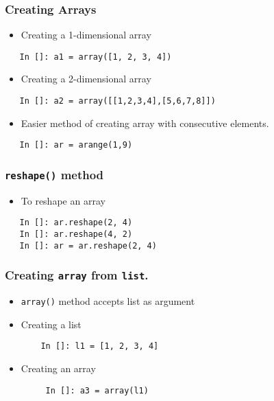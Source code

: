 \documentclass[presentation]{beamer}
\begin{document}
\begin{frame}[fragile]
\frametitle{Creating Arrays}
\label{sec-3}

\begin{itemize}
\item Creating a 1-dimensional array
\end{itemize}

\begin{verbatim}
   In []: a1 = array([1, 2, 3, 4])
\end{verbatim}

\begin{itemize}
\item Creating a 2-dimensional array
\end{itemize}

\begin{verbatim}
   In []: a2 = array([[1,2,3,4],[5,6,7,8]])
\end{verbatim}

\begin{itemize}
\item Easier method of creating array with consecutive elements.
\end{itemize}

\begin{verbatim}
   In []: ar = arange(1,9)
\end{verbatim}
\end{frame}
\begin{frame}[fragile]
\frametitle{\texttt{reshape()} method}
\label{sec-4}

\begin{itemize}
\item To reshape an array
\end{itemize}

\begin{verbatim}
   In []: ar.reshape(2, 4)
   In []: ar.reshape(4, 2)
   In []: ar = ar.reshape(2, 4)
\end{verbatim}
\end{frame}
\begin{frame}[fragile]
\frametitle{Creating \texttt{array} from \texttt{list}.}
\label{sec-5}

\begin{itemize}
\item \texttt{array()} method accepts list as argument
\item Creating a list
\begin{verbatim}
    In []: l1 = [1, 2, 3, 4]
\end{verbatim}

\item Creating an array
\begin{verbatim}
     In []: a3 = array(l1)
\end{verbatim}

\end{itemize}
\end{frame}
\end{document}
